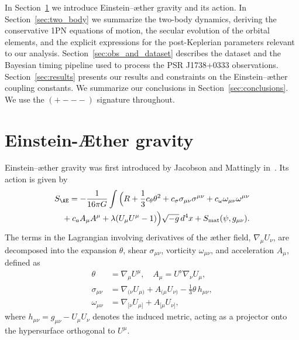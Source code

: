 \documentclass[
    floats,
    floatfix,
    amssymb,
    prd,
    twocolumn,
    superscriptaddress,
    nofootinbib,
    unicode,
    colorlinks=true,
    linktocpage=true
]{revtex4-2}
\begin{document}
In Section~\ref{sec:Einstein-Aether} we introduce Einstein--\ae ther gravity and its action. In Section~\ref{sec:two_body} we summarize the two-body dynamics, deriving the conservative 1PN equations of motion, the secular evolution of the orbital elements, and the explicit expressions for the post-Keplerian parameters relevant to our analysis. Section~\ref{sec:obs_and_dataset} describes the dataset and the Bayesian timing pipeline used to process the PSR J1738+0333 observations. Section~\ref{sec:results} presents our results and constraints on the Einstein--\ae ther coupling constants. 
We summarize our conclusions in Section~\ref{sec:conclusions}.
We use the $(+---)$ signature throughout.

\section{Einstein-\AE ther gravity}
\label{sec:Einstein-Aether}
Einstein--\ae ther gravity was first introduced by Jacobson and Mattingly
in~\cite{Jacobson:2000xp}. Its action is given by
\begin{align}\label{eq:action}
S_{\AE} = -\frac{1}{16\pi G} \int \Big(
R + \frac{1}{3} c_\theta \theta^2
+ c_\sigma \sigma_{\mu\nu}\sigma^{\mu\nu}
+ c_\omega \omega_{\mu\nu}\omega^{\mu\nu} \nonumber \\
\Big. + c_a A_\mu A^\mu
+ \lambda (U_\mu U^\mu - 1)
\Big)\sqrt{-g}\, d^4x
+ S_{\text{mat}}(\psi, g_{\mu\nu}) .
\end{align}
The terms in the Lagrangian involving derivatives of the \ae ther field, $\nabla_\mu U_\nu$,  are decomposed into the expansion \( \theta \), shear \( \sigma_{\mu\nu} \), vorticity
\( \omega_{\mu\nu} \), and acceleration \( A_\mu \), defined as
\begin{align}
\theta &= \nabla_\mu U^\mu , \quad
A_\mu = U^\nu \nabla_\nu U_\mu , \\
\sigma_{\mu\nu} &= \nabla_{(\nu} U_{\mu)} + A_{(\mu} U_{\nu)}
- \frac{1}{3}\theta\, h_{\mu\nu} , \\
\omega_{\mu\nu} &= \nabla_{[\nu} U_{\mu]} + A_{[\mu} U_{\nu]} ,
\end{align}
where \( h_{\mu\nu} = g_{\mu\nu} - U_\mu U_\nu \) denotes the induced metric,
acting as a projector onto the hypersurface orthogonal to \( U^\mu \).
\end{document}

